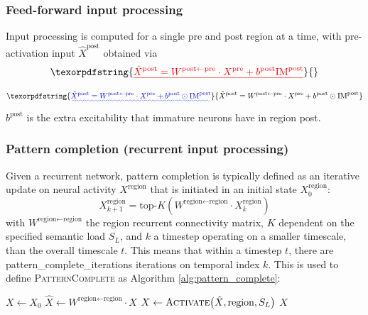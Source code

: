\documentclass{article}
\providecommand{\DIFaddtex}[1]{{\protect\color{blue}\uwave{#1}}} %
\providecommand{\DIFdeltex}[1]{{\protect\color{red}\sout{#1}}}                      %
\providecommand{\DIFaddbegin}{} %
\providecommand{\DIFaddend}{} %
\providecommand{\DIFdelbegin}{} %
\providecommand{\DIFdelend}{} %
\providecommand{\DIFadd}[1]{\texorpdfstring{\DIFaddtex{#1}}{#1}} %
\providecommand{\DIFdel}[1]{\texorpdfstring{\DIFdeltex{#1}}{}} %
\begin{document}
\subsubsection*{Feed-forward input processing}
Input processing is computed for a single pre and post region at a time, with pre-activation input $\hat{X}^\textrm{post}$ obtained via
\DIFdelbegin \begin{displaymath}
    \DIFdel{\hat{X}^\textrm{post} = W^{\textrm{post}\leftarrow\textrm{pre}} \cdot X^\textrm{pre} + b^\textrm{post}\textrm{IM}^\textrm{post}
}\end{displaymath}%
\DIFdelend \DIFaddbegin \begin{equation}
    \DIFadd{\hat{X}^\textrm{post} = W^{\textrm{post}\leftarrow\textrm{pre}} \cdot X^\textrm{pre} + b^\textrm{post}\odot\textrm{IM}^\textrm{post}
}\end{equation}\DIFaddend 
$b^\textrm{post}$ is the extra excitability that immature neurons have in region post.
\subsubsection*{Pattern completion (recurrent input processing)}
Given a recurrent network, pattern completion is typically defined as an iterative update on neural activity $X^\textrm{region}$ that is initiated in an initial state $X^\textrm{region}_0$:
\begin{equation}
    X^{\textrm{region}}_{k+1} = \textrm{top-}K(W^{\textrm{region}\leftarrow\textrm{region}}\cdot X^\textrm{region}_{k})
\end{equation}
with $W^{\textrm{region}\leftarrow\textrm{region}}$ the region recurrent connectivity matrix, $K$ dependent on the specified semantic load $S_L$, and $k$ a timestep operating on a smaller timescale,  than the overall timescale $t$. This means that within a timestep $t$, there are pattern\_complete\_iterations iterations on temporal index $k$. This is used to define \textsc{PatternComplete}  as Algorithm \ref{alg:pattern_complete}:
\begin{algorithm}[h!]
\caption[]{Pattern Completion}\label{alg:pattern_complete}
\begin{algorithmic}[1]
\DIFdelbegin %
\DIFdelend \DIFaddbegin {}
    \DIFaddend \State $X \gets X_0$
    \DIFdelbegin %
\DIFdelend \DIFaddbegin {}
        \DIFaddend \State $\hat{X} \gets W^{\textrm{region} \leftarrow \textrm{region}} \cdot X$
    \State $X \gets \textsc{Activate}\bigl(\hat{X}, \textrm{region}, S_L \bigr)$
    \EndFor
    \State \Return $X$
\EndFunction
\end{algorithmic}
\end{algorithm}
\end{document}
